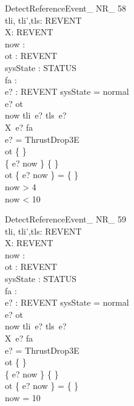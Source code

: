 \begin{schema}{DetectReferenceEvent\_ NR\_ 58}\\
tli, tli',tls: REVENT \fun \nat \\
X: REVENT \fun \nat \\
 now : \nat \\
 ot : REVENT \pfun \nat \\
 sysState : STATUS \\
 fa : \nat \\
 e? : REVENT 
\where
 sysState = normal \\
 e? \notin \dom ot \\
 now \in tli~e? \upto tls~e? \\
 X~e? \geq fa \\
 e? = ThrustDrop3E \\
 ot \neq \{ \} \\
 \{ e? \mapsto now \} \neq \{ \} \\
 ot \cap \{ e? \mapsto now \} = \{ \} \\
 now > 4 \\
 now < 10
\end{schema}


\begin{schema}{DetectReferenceEvent\_ NR\_ 59}\\
tli, tli',tls: REVENT \fun \nat \\
X: REVENT \fun \nat \\
 now : \nat \\
 ot : REVENT \pfun \nat \\
 sysState : STATUS \\
 fa : \nat \\
 e? : REVENT 
\where
 sysState = normal \\
 e? \notin \dom ot \\
 now \in tli~e? \upto tls~e? \\
 X~e? \geq fa \\
 e? = ThrustDrop3E \\
 ot \neq \{ \} \\
 \{ e? \mapsto now \} \neq \{ \} \\
 ot \cap \{ e? \mapsto now \} = \{ \} \\
 now = 10
\end{schema}

